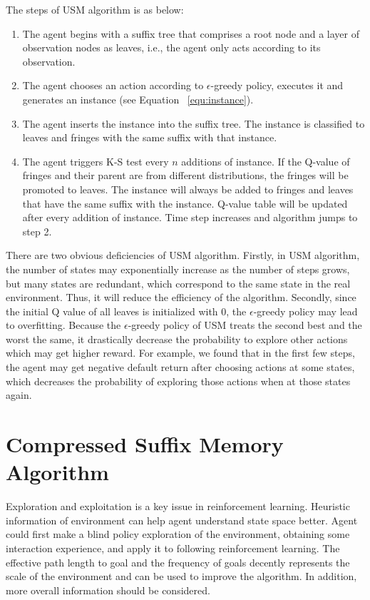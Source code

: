 \documentclass[conference]{IEEEtran}
\begin{document}
	The steps of USM algorithm is as below:
	
	\begin{enumerate}
		\item The agent begins with a suffix tree that comprises a root node and a layer of
		observation nodes as leaves, i.e., the agent only acts according to its observation.
		
		\item The agent chooses an action according to $\epsilon$-greedy policy, executes it and
		generates an instance (see Equation ~\ref{equ:instance}).
		
		\item The agent inserts the instance into the suffix tree. The instance is classified to
		leaves and fringes with the same suffix with that instance. 
		
		\item The agent triggers K-S test every $n$ additions of instance. If the Q-value of fringes
		and their parent are from different distributions, the fringes will be promoted to leaves.
		The instance will always be added to fringes and leaves that have the same suffix with the instance.
		Q-value table will be updated after every addition of instance. Time step increases and algorithm
		jumps to step 2.
	\end{enumerate}
	
	There are two obvious deficiencies of USM algorithm. Firstly, in USM algorithm,
	the number of states may exponentially increase as the number of steps grows, but many
	states are redundant, which correspond to the same state in the real environment. Thus, it
	will reduce the efficiency of the algorithm. Secondly, since the initial Q value of all leaves
	is initialized with 0, the $\epsilon$-greedy policy may lead to overfitting. Because
	the $\epsilon$-greedy policy of USM treats the second best and the worst the same, it drastically
	decrease the probability to explore other actions which may get higher reward. For example,
	we found that in the first few steps, the agent may get negative default return after
	choosing actions at some states, which decreases the probability of exploring those actions
	when at those states again.
	
	\section{Compressed Suffix Memory Algorithm}
	
	Exploration and exploitation is a key issue in reinforcement learning. Heuristic information
	of environment can help agent understand state space better. Agent could first make a blind
	policy exploration of the environment, obtaining some interaction experience, and apply
	it to following reinforcement learning. The effective path length to goal and the frequency
	of goals decently represents the scale of the environment and can be used to improve the algorithm.
	In addition, more overall information should be considered.
	
\end{document}
